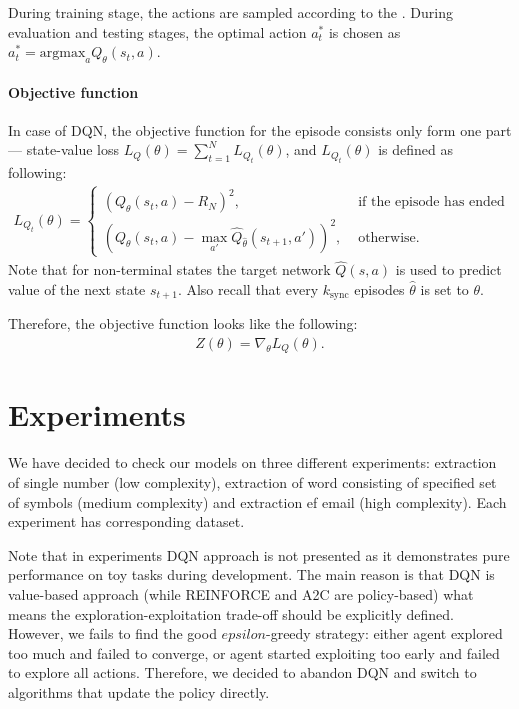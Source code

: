 \documentclass{article}
\begin{document}
During training stage, the actions are sampled according to the
. During evaluation and testing stages, the optimal action
$a_t^\ast$ is chosen as $a_t^\ast =\text{argmax}_a Q_\theta(s_t,a)$.

\paragraph{Objective function}
In case of DQN, the objective function for the episode consists only form one
part --- state-value loss $L_Q(\theta) = \sum_{t=1}^N L_{Q_t}(\theta)$, and
$L_{Q_t}(\theta)$ is defined as following:
\begin{align*}
  L_{Q_t}(\theta) =
  \begin{cases}
    {(Q_\theta(s_t,a) - R_N)}^2,                                         & \text{ if the episode has ended} \\
    {(Q_\theta(s_t,a) - \max_{a'}\hat{Q}_{\hat{\theta}}(s_{t+1},a'))}^2, & \text{ otherwise}.
  \end{cases}
\end{align*}
Note that for non-terminal states the target network
$\hat{Q}(s,a)$ is used to predict value of the next state $s_{t+1}$.
Also recall that every $k_\text{sync}$ episodes $\hat{\theta}$ is set
to $\theta$.

Therefore, the objective function looks like the following:
\begin{align}
  \label{eq:dqn_objective}
  Z(\theta) = \nabla_\theta L_Q(\theta).
\end{align}




\section{Experiments}
We have decided to check our models on three different experiments:
extraction of single number (low complexity), extraction of word consisting of
specified set of symbols (medium complexity) and extraction ef email (high complexity).
Each experiment has corresponding dataset.

Note that in experiments DQN approach is not presented as it demonstrates pure
performance on toy tasks during development. The main reason is that DQN is value-based approach
(while REINFORCE and A2C are policy-based) what means the exploration-exploitation
trade-off should be explicitly defined. However, we fails to find the good $epsilon$-greedy
strategy: either agent explored too much and failed to converge, or agent started exploiting too
early and failed to explore all actions.  Therefore, we decided to abandon DQN and switch to algorithms that update the policy directly.
\end{document}
